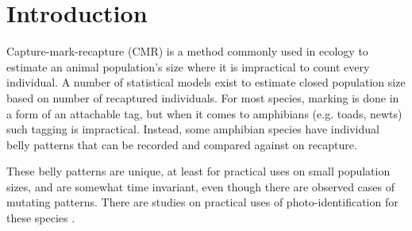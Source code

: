 \documentclass[fleqn,moreauthors,10pt]{ds_report}
\affiliation{\textsuperscript{1}\textit{ae4964@student.uni-lj.si, 63160011}}
\begin{document}
\flushbottom

\maketitle

\thispagestyle{empty}


\section*{Introduction}

Capture-mark-recapture (CMR) is a method commonly used in ecology to estimate an animal population's size where it is impractical to count every individual. A number of statistical models exist to estimate closed population size based on number of recaptured individuals. For most species, marking is done in a form of an attachable tag, but when it comes to amphibians (e.g. toads, newts) such tagging is impractical. Instead, some amphibian species have individual belly patterns that can be recorded and compared against on recapture.

These belly patterns are unique, at least for practical uses on small population sizes, and are somewhat time invariant, even though there are observed cases of mutating patterns. There are studies on practical uses of photo-identification for these species \cite{genecap_ampident}.
\end{document}
